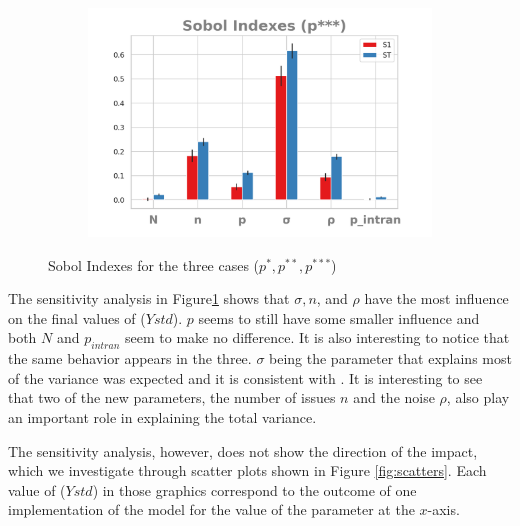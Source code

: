 \documentclass{article}
\begin{document}
\begin{figure}[H]
\begin{subfigure}[b]{0.45\textwidth}
     \end{subfigure}
     \begin{subfigure}[b]{0.5\textwidth}
       \includegraphics[width=\textwidth]{img/sobolpstar3.png}
     \end{subfigure}
     \caption{Sobol Indexes for the three cases (\(p^{*}, p^{**}, p^{***}\))}
     \label{fig:sobol} 
    \end{figure}

    The sensitivity analysis in Figure\ref{fig:sobol} shows that \(\sigma, n \),
    and \(\rho\) have the most influence on the final values of (\(Ystd\)). $p$
    seems to still have some smaller influence and both $N$ and $p_{intran}$
    seem to make no difference. It is also interesting to notice that the same
    behavior appears in the three. \(\sigma\) being the parameter that explains
    most of the variance was expected and it is consistent with
    \citep{martins12b}. It is interesting to see that two of the new parameters,
    the number of issues $n$ and the noise \(\rho\), also play an important role
    in explaining the total variance.
     
    The
    sensitivity analysis, however, does not show the direction of the impact,
    which we investigate through scatter plots shown in Figure \ref{fig:scatters}. Each value of (\(Ystd\)) in those graphics correspond
    to the outcome of one implementation of the model for the value of the parameter at the $x$-axis.
\end{document}
